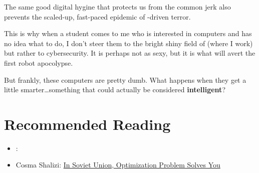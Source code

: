The same good digital hygine that protects us from the common jerk
also prevents the scaled-up, fast-paced epidemic of -driven terror.  

This is why when a student comes to me who is interested in computers
and has no idea what to do, I don't steer them to the bright shiny
field of  (where I work) but rather to cybersecurity.  It is
perhaps not as sexy, but it is what will avert the first robot apocolypse.

But frankly, these computers are pretty dumb.  What happens when they
get a little smarter\dots something that could actually be considered
{\bf intelligent}?


\clearpage

\section{Recommended Reading}


\begin{itemize}

  \item \citet{spufford-10}: 

  \item Cosma Shalizi: \href{http://crookedtimber.org/2012/05/30/in-soviet-union-optimization-problem-solves-you/}{In Soviet Union, Optimization Problem Solves You}

\end{itemize}